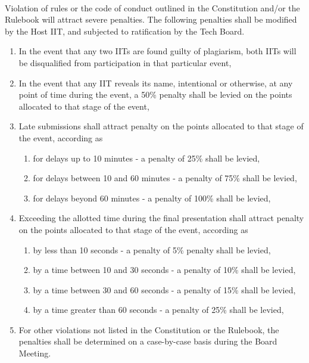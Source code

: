 
\paragraph{}
Violation of rules or the code of conduct outlined in the Constitution and/or the Rulebook will attract severe penalties. The following penalties shall be modified by the Host IIT, and subjected to ratification by the Tech Board.
\begin{enumerate}
    \item In the event that any two IITs are found guilty of plagiarism, both IITs will be disqualified from participation in that particular event,
    \item In the event that any IIT reveals its name, intentional or otherwise, at any point of time during the event, a 50\% penalty shall be levied on the points allocated to that stage of the event,
    \item Late submissions shall attract penalty on the points allocated to that stage of the event, according as
    \begin{enumerate}
        \item for delays up to 10 minutes - a penalty of 25\% shall be levied,
        \item for delays between 10 and 60 minutes - a penalty of 75\% shall be levied,
        \item for delays beyond 60 minutes - a penalty of 100\% shall be levied,
    \end{enumerate}
    \item Exceeding the allotted time during the final presentation shall attract penalty on the points allocated to that stage of the event, according as
    \begin{enumerate}
        \item by less than 10 seconds - a penalty of 5\% penalty shall be levied,
        \item by a time between 10 and 30 seconds - a penalty of 10\% shall be levied,
        \item by a time between 30 and 60 seconds - a penalty of 15\% shall be levied,
        \item by a time greater than 60 seconds - a penalty of 25\% shall be levied,
    \end{enumerate}
    \item For other violations not listed in the Constitution or the Rulebook, the penalties shall be determined on a case-by-case basis during the Board Meeting.
\end{enumerate}
